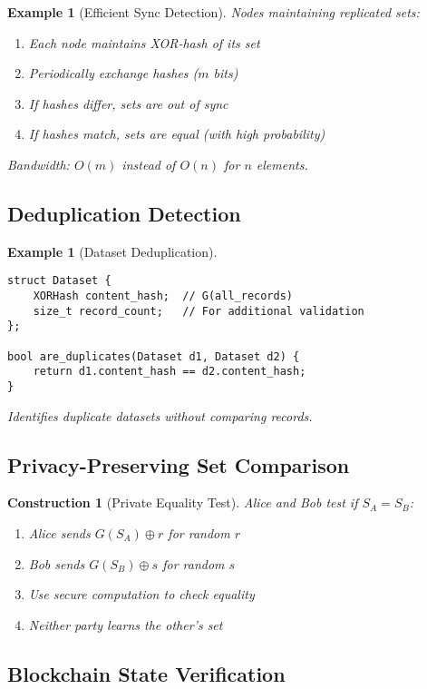 \documentclass[11pt,final,hidelinks]{article}
\newcommand{\XOR}{\oplus}
\newtheorem{example}[theorem]{Example}
\newtheorem{construction}[theorem]{Construction}
\begin{document}
\begin{example}[Efficient Sync Detection]
Nodes maintaining replicated sets:
\begin{enumerate}
    \item Each node maintains XOR-hash of its set
    \item Periodically exchange hashes ($m$ bits)
    \item If hashes differ, sets are out of sync
    \item If hashes match, sets are equal (with high probability)
\end{enumerate}
Bandwidth: $O(m)$ instead of $O(n)$ for $n$ elements.
\end{example}

\subsection{Deduplication Detection}

\begin{example}[Dataset Deduplication]
\begin{verbatim}
struct Dataset {
    XORHash content_hash;  // G(all_records)
    size_t record_count;   // For additional validation
};

bool are_duplicates(Dataset d1, Dataset d2) {
    return d1.content_hash == d2.content_hash;
}
\end{verbatim}
Identifies duplicate datasets without comparing records.
\end{example}

\subsection{Privacy-Preserving Set Comparison}

\begin{construction}[Private Equality Test]
Alice and Bob test if $S_A = S_B$:
\begin{enumerate}
    \item Alice sends $G(S_A) \XOR r$ for random $r$
    \item Bob sends $G(S_B) \XOR s$ for random $s$  
    \item Use secure computation to check equality
    \item Neither party learns the other's set
\end{enumerate}
\end{construction}

\subsection{Blockchain State Verification}
\end{document}

